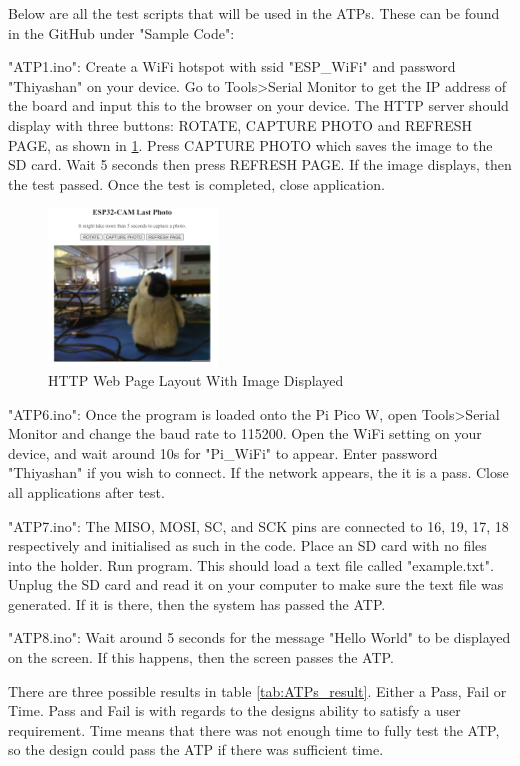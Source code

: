 \documentclass[class=report,11pt,crop=false]{standalone}
\begin{document}
Below are all the test scripts that will be used in the ATPs. These can be found in the GitHub under "Sample Code":

"ATP1.ino": Create a WiFi hotspot with ssid "ESP\_WiFi" and password "Thiyashan" on your device. Go to Tools>Serial Monitor to get the IP address of the board and input this to the browser on your device. The HTTP server should display with three buttons: ROTATE, CAPTURE PHOTO and REFRESH PAGE, as shown in \ref{fig:ATP1_Test}. Press CAPTURE PHOTO which saves the image to the SD card. Wait 5 seconds then press REFRESH PAGE. If the image displays, then the test passed. Once the test is completed, close application. \cite{randomnerdtutorialsESP32CAMTake}

\begin{figure}[h]
\centering
\includegraphics[width=0.4\textwidth]{Images/ATP1.png}
\caption{HTTP Web Page Layout With Image Displayed}
\label{fig:ATP1_Test}
\end{figure}

"ATP6.ino": Once the program is loaded onto the Pi Pico W, open Tools>Serial Monitor and change the baud rate to 115200. Open the WiFi setting on your device, and wait around 10s for "Pi\_WiFi" to appear. Enter password "Thiyashan" if you wish to connect. If the network appears, the it is a pass. Close all applications after test.

"ATP7.ino": The MISO, MOSI, SC, and SCK pins are connected to 16, 19, 17, 18 respectively and initialised as such in the code. Place an SD card with no files into the holder. Run program. This should load a text file called "example.txt". Unplug the SD card and read it on your computer to make sure the text file was generated. If it is there, then the system has passed the ATP. 

"ATP8.ino": Wait around 5 seconds for the message "Hello World" to be displayed on the screen. If this happens, then the screen passes the ATP. 

There are three possible results in table \ref{tab:ATPs_result}. Either a Pass, Fail or Time. Pass and Fail is with regards to the designs ability to satisfy a user requirement. Time means that there was not enough time to fully test the ATP, so the design could pass the ATP if there was sufficient time. 
\end{document}

